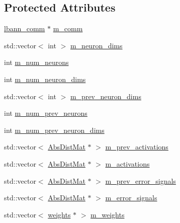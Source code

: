 \subsection*{Protected Attributes}
\begin{DoxyCompactItemize}
\item 
\hyperlink{classlbann_1_1lbann__comm}{lbann\+\_\+comm} $\ast$ \hyperlink{classlbann_1_1Layer_a5de05c52f22e0bbd7c703bec3ad4dbf2}{m\+\_\+comm}
\item 
std\+::vector$<$ int $>$ \hyperlink{classlbann_1_1Layer_abb34bb8031f57a483e2e327a5f229f48}{m\+\_\+neuron\+\_\+dims}
\item 
int \hyperlink{classlbann_1_1Layer_a6b5ebc8a7d9329d8a773ed787e7b41d8}{m\+\_\+num\+\_\+neurons}
\item 
int \hyperlink{classlbann_1_1Layer_adfd6178d21498c9095cd947ae1eb2d6a}{m\+\_\+num\+\_\+neuron\+\_\+dims}
\item 
std\+::vector$<$ int $>$ \hyperlink{classlbann_1_1Layer_ae204d1a2a79606eaa117273857ff62a3}{m\+\_\+prev\+\_\+neuron\+\_\+dims}
\item 
int \hyperlink{classlbann_1_1Layer_ac7b30f4e28d58204bfcbb76886f9136d}{m\+\_\+num\+\_\+prev\+\_\+neurons}
\item 
int \hyperlink{classlbann_1_1Layer_adc052afb38f170e839db00d3c8151d1e}{m\+\_\+num\+\_\+prev\+\_\+neuron\+\_\+dims}
\item 
std\+::vector$<$ \hyperlink{base_8hpp_a9a697a504ae84010e7439ffec862b470}{Abs\+Dist\+Mat} $\ast$ $>$ \hyperlink{classlbann_1_1Layer_a52314601c3458268f56e017dc2ade357}{m\+\_\+prev\+\_\+activations}
\item 
std\+::vector$<$ \hyperlink{base_8hpp_a9a697a504ae84010e7439ffec862b470}{Abs\+Dist\+Mat} $\ast$ $>$ \hyperlink{classlbann_1_1Layer_a7caf08e938141d1584e6939cefa4baed}{m\+\_\+activations}
\item 
std\+::vector$<$ \hyperlink{base_8hpp_a9a697a504ae84010e7439ffec862b470}{Abs\+Dist\+Mat} $\ast$ $>$ \hyperlink{classlbann_1_1Layer_a6fdcbf884150d0b20cffe678fefd7caa}{m\+\_\+prev\+\_\+error\+\_\+signals}
\item 
std\+::vector$<$ \hyperlink{base_8hpp_a9a697a504ae84010e7439ffec862b470}{Abs\+Dist\+Mat} $\ast$ $>$ \hyperlink{classlbann_1_1Layer_a452e22ac81c1a799f0614b3e942ea726}{m\+\_\+error\+\_\+signals}
\item 
std\+::vector$<$ \hyperlink{classlbann_1_1weights}{weights} $\ast$ $>$ \hyperlink{classlbann_1_1Layer_a7954e30fbf9100a6ba4b56d02767a469}{m\+\_\+weights}
\item 

\end{DoxyCompactItemize}
